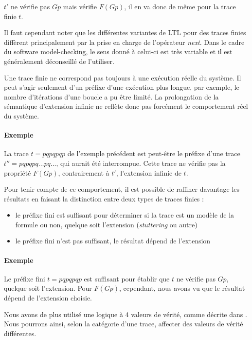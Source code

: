 \(t'\) ne vérifie pas \(G p\) mais vérifie \(F(G p)\), il en va donc de même
pour la trace finie \(t\).

Il faut cependant noter que les différentes variantes de \ac{LTL} pour des
traces finies diffèrent principalement par la prise en charge de
l'opérateur \emph{next}. Dans le cadre du software model-checking, le
sens donné à celui-ci est très variable et il est généralement
déconseillé de l'utiliser.

Une trace finie ne correspond pas toujours à une exécution réelle du système.
Il peut s'agir seulement d'un préfixe d'une exécution plus longue, par exemple,
le nombre d'itérations d'une boucle a pu être limité. La prolongation de la
sémantique d'extension infinie ne reflète donc pas forcément le comportement
réel du système.

\paragraph{Exemple}
La trace \(t = pqpqpqp\) de l'exemple précédent est peut-être le préfixe d'une
trace \(t'' = pqpqpq\dots pq\dots\), qui aurait été interrompue. Cette trace ne
vérifie pas la propriété \(F (G p)\), contrairement à \(t'\), l'extension infinie de \(t\).

Pour tenir compte de ce comportement, il est possible de raffiner davantage les
résultats en faisant la distinction entre deux types de traces finies :

\begin{itemize}
\item
  le préfixe fini est suffisant pour déterminer si la trace est un
  modèle de la formule ou non, quelque soit l'extension
  (\emph{stuttering} ou autre)
\item
  le préfixe fini n'est pas suffisant, le résultat dépend de l'extension
\end{itemize}

\paragraph{Exemple}
Le préfixe fini \(t = pqpqpqp\) est suffisant pour établir que \(t\) ne vérifie
pas \(G p\), quelque soit l'extension. Pour \(F (G p)\), cependant, nous avons
vu que le résultat dépend de l'extension choisie.

Nous avons de plus utilisé une logique à 4 valeurs de vérité, comme
décrite dans \cite{morse_ltl}. Nous pourrons ainsi, selon la catégorie d'une
trace, affecter des valeurs de vérité différentes.

